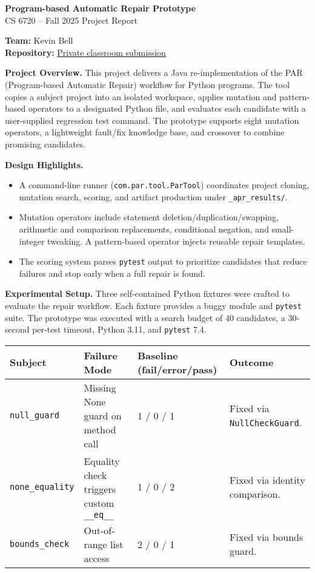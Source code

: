 \documentclass[11pt]{article}
\begin{document}
\begin{center}
  {\LARGE\bfseries Program-based Automatic Repair Prototype}\\[0.5em]
  {CS 6720 -- Fall 2025 Project Report}
\end{center}

\textbf{Team:} Kevin Bell \\
\textbf{Repository:} \href{https://github.com/}{Private classroom submission}

\textbf{Project Overview.} This project delivers a Java re-implementation of the PAR (Program-based Automatic Repair) workflow for Python programs. The tool copies a subject project into an isolated workspace, applies mutation and pattern-based operators to a designated Python file, and evaluates each candidate with a user-supplied regression test command. The prototype supports eight mutation operators, a lightweight fault/fix knowledge base, and crossover to combine promising candidates.

\textbf{Design Highlights.}
\begin{itemize}[leftmargin=1.25em]
  \item A command-line runner (\texttt{com.par.tool.ParTool}) coordinates project cloning, mutation search, scoring, and artifact production under \texttt{\_apr\_results/}.
  \item Mutation operators include statement deletion/duplication/swapping, arithmetic and comparison replacements, conditional negation, and small-integer tweaking. A pattern-based operator injects reusable repair templates.
  \item The scoring system parses \texttt{pytest} output to prioritize candidates that reduce failures and stop early when a full repair is found.
\end{itemize}

\textbf{Experimental Setup.} Three self-contained Python fixtures were crafted to evaluate the repair workflow. Each fixture provides a buggy module and \texttt{pytest} suite. The prototype was executed with a search budget of 40 candidates, a 30-second per-test timeout, Python 3.11, and \texttt{pytest} 7.4.

\begin{table}[h]
  \centering
  \begin{tabular}{@{}llll@{}}
    \toprule
    Subject & Failure Mode & Baseline (fail/error/pass) & Outcome \\
    \midrule
    \texttt{null\_guard} & Missing None guard on method call & 1 / 0 / 1 & Fixed via \texttt{NullCheckGuard}. \\
    \texttt{none\_equality} & Equality check triggers custom \texttt{\_\_eq\_\_} & 1 / 0 / 2 & Fixed via identity comparison. \\
    \texttt{bounds\_check} & Out-of-range list access & 2 / 0 / 1 & Fixed via bounds guard. \\
    \bottomrule
  \end{tabular}
\end{table}
\end{document}
